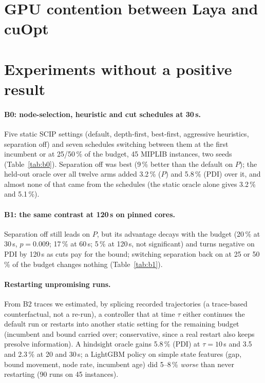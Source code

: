 \section{GPU contention between Laya and cuOpt}\label{app:contention}



\section{Experiments without a positive result}\label{app:nofruit}
\paragraph{B0: node-selection, heuristic and cut schedules at 30\,s.} Five static SCIP settings (default, depth-first,
best-first, aggressive heuristics, separation off) and seven schedules switching between them at the first
incumbent or at 25/50\,\% of the budget, 45 MIPLIB instances, two seeds (Table~\ref{tab:b0}). Separation off was best
(9\,\% better than the default on $P$); the held-out oracle over all twelve arms added 3.2\,\% ($P$) and 5.8\,\% (PDI) over
it, and almost none of that came from the schedules (the static oracle alone gives 3.2\,\% and 5.1\,\%).


\paragraph{B1: the same contrast at 120\,s on pinned cores.} Separation off still leads on $P$, but its advantage
decays with the budget (20\,\% at 30\,s, $p=0.009$; 17\,\% at 60\,s; 5\,\% at 120\,s, not significant) and turns negative on
PDI by 120\,s as cuts pay for the bound; switching separation back on at 25 or 50\,\% of the budget changes nothing (Table~\ref{tab:b1}).


\paragraph{Restarting unpromising runs.} From B2 traces we estimated, by splicing recorded trajectories (a trace-based counterfactual, not a re-run), a controller that at time $\tau$ either
continues the default run or restarts into another static setting for the remaining budget (incumbent and bound
carried over; conservative, since a real restart also keeps presolve information). A hindsight oracle gains 5.8\,\%
(PDI) at $\tau=10$\,s and 3.5 and 2.3\,\% at 20 and 30\,s; a LightGBM policy on simple state features (gap, bound
movement, node rate, incumbent age) did 5--8\,\% \emph{worse} than never restarting (90 runs on 45 instances).

